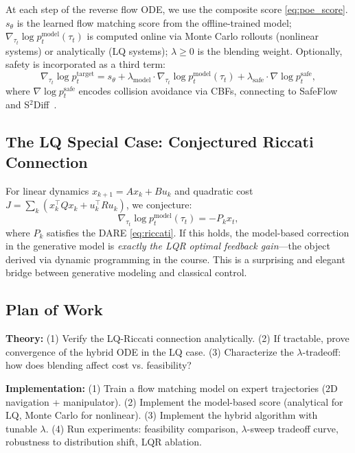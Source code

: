 \documentclass[letterpaper, 10pt, conference]{ieeeconf}
\newcommand{\scoremodel}{\nabla_{\tau_t}\log p_t^{\mathrm{model}}(\tau_t)}
\begin{document}
At each step of the reverse flow ODE, we use the composite score
\eqref{eq:poe_score}.  $s_\theta$ is the learned flow matching score
from the offline-trained model; $\scoremodel$ is computed online via Monte Carlo
rollouts (nonlinear systems) or analytically (LQ systems); $\lambda\geq 0$
is the blending weight.  Optionally, safety is incorporated as a third term:
\begin{equation}
  \nabla_{\tau_t}\log p_t^{\mathrm{target}}
  = s_\theta + \lambda_{\mathrm{model}}\cdot\scoremodel
    + \lambda_{\mathrm{safe}}\cdot\nabla\log p_t^{\mathrm{safe}},
  \label{eq:three_score}
\end{equation}
where $\nabla\log p_t^{\mathrm{safe}}$ encodes collision avoidance via CBFs,
connecting to SafeFlow~\cite{safeflow} and
S$^2$Diff~\cite{s2diff}.

\subsection{The LQ Special Case: Conjectured Riccati Connection}

For linear dynamics $x_{k+1} = Ax_k + Bu_k$ and quadratic cost
$J = \sum_k(x_k^\top Qx_k + u_k^\top Ru_k)$, we conjecture:
\begin{equation}
  \scoremodel = -P_k x_t,
  \label{eq:riccati_score}
\end{equation}
where $P_k$ satisfies the DARE \eqref{eq:riccati}.  If this holds,
the model-based correction in the generative model is \emph{exactly the LQR
optimal feedback gain}---the object derived via dynamic programming in the
course.  This is a surprising and elegant bridge between generative modeling
and classical control.

\subsection{Plan of Work}

\textbf{Theory:} (1) Verify the LQ-Riccati connection analytically.
(2) If tractable, prove convergence of the hybrid ODE in the LQ case.
(3) Characterize the $\lambda$-tradeoff: how does blending affect cost vs.
feasibility?

\textbf{Implementation:} (1) Train a flow matching model on expert trajectories
(2D navigation + manipulator). (2) Implement the model-based score (analytical
for LQ, Monte Carlo for nonlinear). (3) Implement the hybrid algorithm with
tunable $\lambda$. (4) Run experiments: feasibility comparison, $\lambda$-sweep
tradeoff curve, robustness to distribution shift, LQR ablation.
\end{document}
